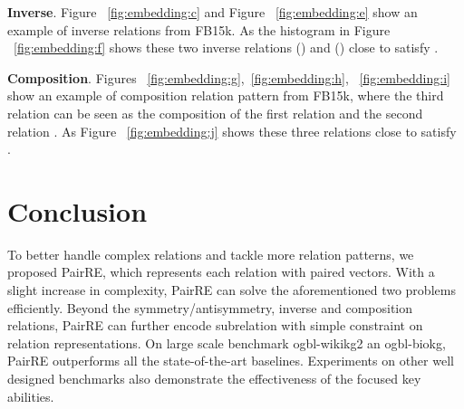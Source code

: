 \documentclass[11pt,a4paper]{article}
\begin{document}
\textbf{Inverse}. Figure ~\ref{fig:embedding:c} and Figure ~\ref{fig:embedding:e} show an example of inverse relations from FB15k.
As the histogram in Figure ~\ref{fig:embedding:f} shows these two inverse relations  () and  () close to satisfy .

\textbf{Composition}. Figures ~\ref{fig:embedding:g},~\ref{fig:embedding:h}, ~\ref{fig:embedding:i} show an example of composition relation pattern from FB15k, where the third relation  can be seen as the composition of the first relation  and the second relation .
As Figure ~\ref{fig:embedding:j} shows these three relations close to
satisfy .

\section{Conclusion}
To better handle complex relations and tackle more relation patterns, we proposed PairRE, which represents each relation with paired vectors.
With a slight increase in complexity, PairRE can solve the aforementioned two problems efficiently.
Beyond the symmetry/antisymmetry, inverse and composition relations, PairRE can further encode subrelation with simple constraint on relation representations.
On large scale benchmark ogbl-wikikg2 an ogbl-biokg, PairRE outperforms all the state-of-the-art baselines. 
Experiments on other well designed benchmarks also demonstrate the effectiveness of the focused key abilities.



\end{document}
